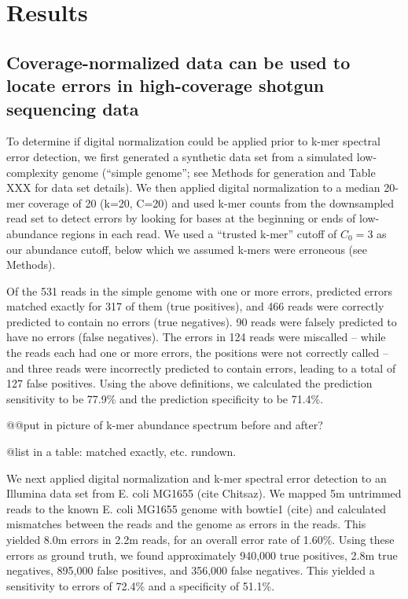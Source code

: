 \section{Results}

\subsection{Coverage-normalized data can be used to locate
errors in high-coverage shotgun sequencing data}

To determine if digital normalization could be applied prior to k-mer
spectral error detection, we first generated a synthetic data set from
a simulated low-complexity genome (``simple genome''; see Methods for
generation and Table XXX for data set details).  We then applied
digital normalization to a median 20-mer coverage of 20 (k=20, C=20)
and used k-mer counts from the downsampled read set to detect errors
by looking for bases at the beginning or ends of low-abundance regions
in each read. We used a ``trusted k-mer'' cutoff of $C_0 = 3$ as our
abundance cutoff, below which we assumed k-mers were erroneous (see Methods).

Of the 531 reads in the simple genome with one or more errors,
predicted errors matched exactly for 317 of them (true positives), and
466 reads were correctly predicted to contain no errors (true
negatives). 90 reads were falsely predicted to have no errors (false
negatives). The errors in 124 reads were miscalled -- while the reads
each had one or more errors, the positions were not correctly called
-- and three reads were incorrectly predicted to contain errors,
leading to a total of 127 false positives.  Using the above
definitions, we calculated the prediction sensitivity to be 77.9\% and
the prediction specificity to be 71.4\%.

@@put in picture of k-mer abundance spectrum before and after?

@list in a table: matched exactly, etc. rundown.

We next applied digital normalization and k-mer spectral error
detection to an Illumina data set from E. coli MG1655 (cite Chitsaz).
We mapped 5m untrimmed reads to the known E. coli MG1655 genome with
bowtie1 (cite) and calculated mismatches between the reads and the
genome as errors in the reads.  This yielded 8.0m errors in 2.2m reads,
for an overall error rate of 1.60\%.  Using these errors as ground truth,
we found approximately 940,000 true positives, 2.8m true negatives,
895,000 false positives, and 356,000 false negatives.  This yielded
a sensitivity to errors of 72.4\% and a specificity of 51.1\%.

